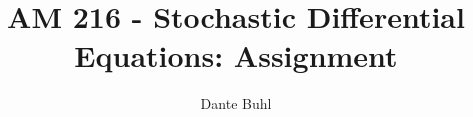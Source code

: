 \documentclass{article}
\begin{document}
\title{AM 216 - Stochastic Differential Equations: Assignment }
\author{Dante Buhl}


\newcommand{\wrms}{w_{\text{rms}}}
\newcommand{\bs}[1]{\boldsymbol{#1}}
\newcommand{\tb}[1]{\textbf{#1}}
\newcommand{\bmp}[1]{\begin{minipage}{#1\textwidth}}
\newcommand{\emp}{\end{minipage}}
\newcommand{\R}{\mathbb{R}}
\newcommand{\C}{\mathbb{C}}
\newcommand{\N}{\mathcal{N}}
\newcommand{\Var}{\text{Var}}
\newcommand{\Cov}{\text{Cov}}
\newcommand{\Bino}{\text{Bino}}
\newcommand{\Norm}{\mathcal{N}}
\newcommand{\erf}{\text{erf}}
\newcommand{\m}{\bs{\mu}_*}
\newcommand{\s}{\bs{\Sigma}_*}
\newcommand{\dt}{\Delta t}
\newcommand{\dx}{\Delta x}
\newcommand{\tr}[1]{\text{Tr}(#1)}
\newcommand{\Tr}[1]{\text{Tr}(#1)}
\newcommand{\Div}{\nabla \cdot}
\renewcommand{\div}{\nabla \cdot}
\newcommand{\Curl}{\nabla \times}
\newcommand{\Grad}{\nabla}
\newcommand{\grad}{\nabla}
\newcommand{\grads}{\nabla_s}
\newcommand{\gradf}{\nabla_f}
\newcommand{\xs}{x_s}
\newcommand{\x}{\bs{x}}
\newcommand{\xf}{x_f}
\newcommand{\ts}{t_s}
\newcommand{\tf}{t_f}
\newcommand{\pt}{\partial t}
\newcommand{\pz}{\partial z}
\newcommand{\uvec}{\bs{u}}
\newcommand{\bvec}{\bs{B}}
\newcommand{\nvec}{\hat{\bs{n}}}
\newcommand{\tu}{\tilde{\uvec}}
\newcommand{\B}{\bs{B}}
\newcommand{\A}{\bs{A}}
\newcommand{\jvec}{\bs{j}}
\newcommand{\F}{\bs{F}}
\newcommand{\T}{\tilde{T}}
\newcommand{\ez}{\bs{e}_z}
\newcommand{\ex}{\bs{e}_x}
\newcommand{\ey}{\bs{e}_y}
\newcommand{\eo}{\bs{e}_{\bs{\Omega}}}
\newcommand{\ppt}[1]{\frac{\partial #1}{\partial t}}
\newcommand{\pp}[2]{\frac{\partial #1}{\partial #2}}
\newcommand{\pptwo}[2]{\frac{\partial^2 #1}{\partial #2^2}}
\newcommand{\ddtwo}[2]{\frac{d^2 #1}{d #2^2}}
\newcommand{\DDt}[1]{\frac{D #1}{D t}}
\newcommand{\ppts}[1]{\frac{\partial #1}{\partial t_s}}
\newcommand{\pptf}[1]{\frac{\partial #1}{\partial t_f}}
\newcommand{\ppz}[1]{\frac{\partial #1}{\partial z}}
\newcommand{\ddz}[1]{\frac{d #1}{d z}}
\newcommand{\ppzetas}[1]{\frac{\partial^2 #1}{\partial \zeta^2}}
\newcommand{\ppzs}[1]{\frac{\partial #1}{\partial z_s}}
\newcommand{\ppzf}[1]{\frac{\partial #1}{\partial z_f}}
\newcommand{\ppx}[1]{\frac{\partial #1}{\partial x}}
\newcommand{\ddx}[1]{\frac{d #1}{d x}}
\newcommand{\ppxi}[1]{\frac{\partial #1}{\partial x_i}}
\newcommand{\ppxj}[1]{\frac{\partial #1}{\partial x_j}}
\newcommand{\ppy}[1]{\frac{\partial #1}{\partial y}}
\newcommand{\ppzeta}[1]{\frac{\partial #1}{\partial \zeta}}
\renewcommand{\k}{\bs{k}}
\newcommand{\real}[1]{\text{Re}\left[#1\right]}
\end{document}
